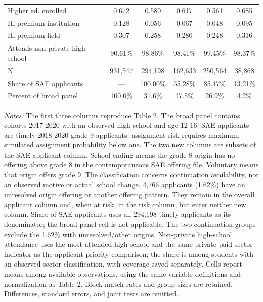 \begin{table}[H]
\begin{tabular}{@{}lccccc@{}}
Higher ed. enrolled & 0.672 & 0.580 & 0.617 & 0.561 & 0.685 \\
Hi-premium institution & 0.128 & 0.056 & 0.067 & 0.048 & 0.095 \\
Hi-premium field & 0.307 & 0.258 & 0.280 & 0.248 & 0.316 \\
Attends non-private high school & 90.61\% & 98.86\% & 98.41\% & 99.45\% & 98.37\% \\
N & 931,547 & 294,198 & 162,633 & 250,564 & 38,868 \\
Share of SAE applicants & --- & 100.00\% & 55.28\% & 85.17\% & 13.21\% \\
Percent of broad panel & 100.0\% & 31.6\% & 17.5\% & 26.9\% & 4.2\% \\
\bottomrule
\end{tabular}
\par\medskip\footnotesize
\begin{minipage}{\textwidth}
\textit{Notes:} The first three columns reproduce Table 2. The broad panel contains cohorts 2017-2020 with an observed high school and age 12-16. SAE applicants are timely 2018-2020 grade-9 applicants; assignment risk requires maximum simulated assignment probability below one. The two new columns are subsets of the SAE-applicant column. School ending means the grade-8 origin has no offering above grade 8 in the contemporaneous SAE offering file. Voluntary means that origin offers grade 9. The classification concerns continuation availability, not an observed motive or actual school change. 4,766 applicants (1.62\%) have an unresolved origin offering or another offering pattern. They remain in the overall applicant column and, when at risk, in the risk column, but enter neither new column. Share of SAE applicants uses all 294,198 timely applicants as its denominator; the broad-panel cell is not applicable. The two continuation groups exclude the 1.62\% with unresolved/other origins. Non-private high-school attendance uses the most-attended high school and the same private-paid sector indicator as the applicant-priority comparison; the share is among students with an observed sector classification, with coverage saved separately. Cells report means among available observations, using the same variable definitions and normalization as Table 2. Block match rates and group sizes are retained. Differences, standard errors, and joint tests are omitted.
\end{minipage}
\end{table}
